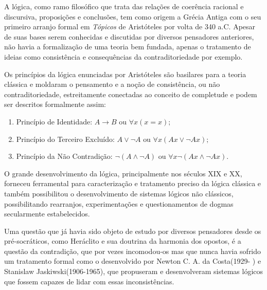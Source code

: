A lógica, como ramo filosófico que trata das relações de coerência racional e discursiva, proposições e conclusões, tem como origem a Grécia Antiga com o seu primeiro arranjo formal em \emph{Tópicos} de Aristóteles por volta de 340 a.C. Apesar de suas bases serem conhecidas e discutidas por diversos pensadores anteriores, não havia a formalização de uma teoria bem fundada, apenas o tratamento de ideias como consistência e consequências da contraditoriedade por exemplo. 

Os princípios da lógica enunciadas por Aristóteles são basilares para a teoria clássica e moldaram o pensamento e a noção de consistência, ou não contraditoriedade, estreitamente conectadas ao conceito de completude e podem ser descritos formalmente assim:


\begin{enumerate}
\item Princípio de Identidade: 
    \begin{math}
	A \rightarrow B 
	\textrm{ ou } 
	\forall x(x=x);
    \end{math}

\item Princípio do Terceiro Excluído:
    \begin{math}
	A \vee \neg A
	\textrm{ ou }
	\forall x(Ax \vee \neg Ax);
    \end{math}

\item Princípio da Não Contradição: 
    \begin{math}
	\neg (A \wedge \neg A)
	\textrm{ ou }
	\forall x\neg(Ax \wedge \neg Ax).
    \end{math}

\end{enumerate}

O grande desenvolvimento da lógica, principalmente nos séculos XIX e XX, forneceu ferramental para caracterização e tratamento preciso da lógica clássica e também possibilitou o desenvolvimento de sistemas lógicos não clássicos, possibilitando rearranjos, experimentações e questionamentos de dogmas secularmente estabelecidos.

Uma questão que já havia sido objeto de estudo por diversos pensadores desde os pré-socráticos, como Heráclito e sua doutrina da harmonia dos opostos, é a questão da contradição, que por vezes incomodou-os mas que nunca havia sofrido um tratamento formal como o desenvolvido por Newton C. A. da Costa(1929- ) e Stanislaw Jaskiwski(1906-1965), que propuseram e desenvolveram sistemas lógicos que fossem capazes de lidar com essas inconsistências. 

